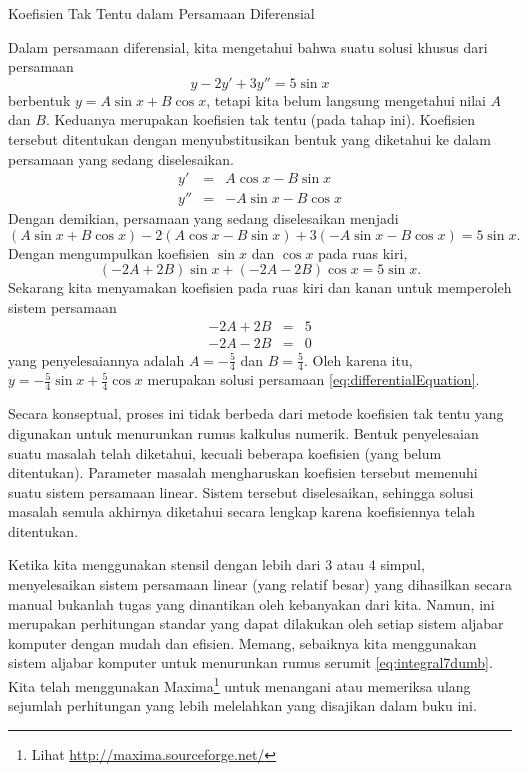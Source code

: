\noindent\begin{digression}{Koefisien Tak Tentu dalam Persamaan Diferensial}

\noindent Dalam persamaan diferensial, kita mengetahui bahwa suatu
solusi khusus dari persamaan
\begin{equation}
y-2y'+3y''=5\sin x\label{eq:differentialEquation}
\end{equation}
berbentuk $y=A\sin x+B\cos x$, tetapi kita belum langsung mengetahui
nilai $A$ dan $B$. Keduanya merupakan koefisien tak tentu (pada
tahap ini). Koefisien tersebut ditentukan dengan menyubstitusikan
bentuk yang diketahui ke dalam persamaan yang sedang diselesaikan.
\begin{eqnarray*}
y' & = & A\cos x-B\sin x\\
y'' & = & -A\sin x-B\cos x
\end{eqnarray*}
Dengan demikian, persamaan yang sedang diselesaikan menjadi
\[
(A\sin x+B\cos x)-2(A\cos x-B\sin x)+3(-A\sin x-B\cos x)=5\sin x.
\]
Dengan mengumpulkan koefisien $\sin x$ dan $\cos x$ pada ruas kiri,
\[
(-2A+2B)\sin x+(-2A-2B)\cos x=5\sin x.
\]
Sekarang kita menyamakan koefisien pada ruas kiri dan kanan untuk
memperoleh sistem persamaan
\begin{eqnarray*}
-2A+2B & = & 5\\
-2A-2B & = & 0
\end{eqnarray*}
yang penyelesaiannya adalah $A=-\frac{5}{4}$ dan $B=\frac{5}{4}$.
Oleh karena itu, $y=-\frac{5}{4}\sin x+\frac{5}{4}\cos x$ merupakan
solusi persamaan \ref{eq:differentialEquation}.

Secara konseptual, proses ini tidak berbeda dari metode koefisien
tak tentu yang digunakan untuk menurunkan rumus kalkulus numerik.
Bentuk penyelesaian suatu masalah telah diketahui, kecuali beberapa
koefisien (yang belum ditentukan). Parameter masalah mengharuskan
koefisien tersebut memenuhi suatu sistem persamaan linear. Sistem
tersebut diselesaikan, sehingga solusi masalah semula akhirnya diketahui
secara lengkap karena koefisiennya telah ditentukan.

\noindent\end{digression}

Ketika kita menggunakan stensil dengan lebih dari 3 atau 4 simpul,
menyelesaikan sistem persamaan linear (yang relatif besar) yang dihasilkan
secara manual bukanlah tugas yang dinantikan oleh kebanyakan dari
kita. Namun, ini merupakan perhitungan standar yang dapat dilakukan
oleh setiap sistem aljabar komputer dengan mudah dan efisien. Memang,
sebaiknya kita menggunakan sistem aljabar komputer untuk menurunkan
rumus serumit \ref{eq:integral7dumb}. Kita telah menggunakan Maxima\footnote{Lihat \url{http://maxima.sourceforge.net/}}
untuk menangani atau memeriksa ulang sejumlah perhitungan yang lebih
melelahkan yang disajikan dalam buku ini.


